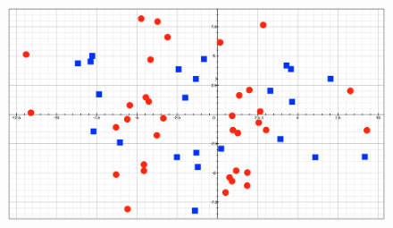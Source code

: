 \documentclass{amsart}
\begin{document}
\begin{figure}
\caption{}
\includegraphics[width=\textwidth]{sin.png}
\end{figure}
\end{document}
